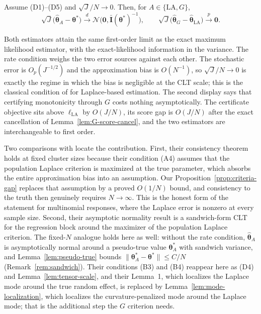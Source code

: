 \begin{theorem}
Assume (D1)--(D5) and $\sqrt{J}/N\to0$. Then, for $A\in\{\text{LA},G\}$,
\begin{equation}
    \sqrt{J}\big(\hat{\bm{\theta}}_{A}-\bm{\theta}^{*}\big)\xrightarrow{d}\mathcal{N}\big(\bm{0},\bar{\mathbf{I}}(\bm{\theta}^{*})^{-1}\big),\qquad\sqrt{J}\big(\hat{\bm{\theta}}_{G}-\hat{\bm{\theta}}_{\text{LA}}\big)\xrightarrow{p}\bm{0}.
    \label{eq:computable-an}
\end{equation}
\label{thm:computable-an}
\end{theorem}

Both estimators attain the same first-order limit as the exact maximum likelihood estimator, with the exact-likelihood information in the variance. The rate condition weighs the two error sources against each other. The stochastic error is $O_{p}(J^{-1/2})$ and the approximation bias is $O(N^{-1})$, so $\sqrt{J}/N\to0$ is exactly the regime in which the bias is negligible at the CLT scale; this is the classical condition of \citet{Vonesh1996} for Laplace-based estimation. The second display says that certifying monotonicity through $G$ costs nothing asymptotically. The certificate objective sits above $\ell_{\text{LA}}$ by $O(J/N)$, its score gap is $O(J/N)$ after the exact cancellation of Lemma~\ref{lem:G-score-cancel}, and the two estimators are interchangeable to first order.

Two comparisons with \citet{Yue2026} locate the contribution. First, their consistency theorem holds at fixed cluster sizes because their condition (A4) assumes that the population Laplace criterion is maximized at the true parameter, which absorbs the entire approximation bias into an assumption. Our Proposition~\ref{prop:criteria-gap} replaces that assumption by a proved $O(1/N)$ bound, and consistency to the truth then genuinely requires $N\to\infty$. This is the honest form of the statement for multinomial responses, where the Laplace error is nonzero at every sample size. Second, their asymptotic normality result is a sandwich-form CLT for the regression block around the maximizer of the population Laplace criterion. The fixed-$N$ analogue holds here as well: without the rate condition, $\hat{\bm{\theta}}_{A}$ is asymptotically normal around a pseudo-true value $\bm{\theta}^{*}_{A}$ with sandwich variance, and Lemma~\ref{lem:pseudo-true} bounds $\|\bm{\theta}^{*}_{A}-\bm{\theta}^{*}\|\leq C/N$ (Remark~\ref{rem:sandwich}). Their conditions (B3) and (B4) reappear here as (D4) and Lemma~\ref{lem:tensor-scale}, and their Lemma~1, which localizes the Laplace mode around the true random effect, is replaced by Lemma~\ref{lem:mode-localization}, which localizes the curvature-penalized mode around the Laplace mode; that is the additional step the $G$ criterion needs.

